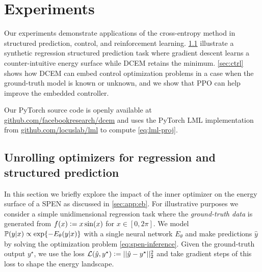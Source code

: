 \documentclass{article}
\begin{document}
\section{Experiments}
Our experiments demonstrate applications of the cross-entropy method
in structured prediction, control, and reinforcement learning.
\cref{sec:exp:reg} illustrate a synthetic regression structured
prediction task where gradient descent learns a counter-intuitive
energy surface while DCEM retains the minimum.
\cref{sec:ctrl} shows how DCEM can embed control optimization problems
in a case when the ground-truth model is known or unknown, and
we show that PPO \citep{schulman2017proximal} can help improve
the embedded controller.

Our PyTorch \citep{paszke2019pytorch} source code is openly available at
\href{http://github.com/facebookresearch/dcem}{github.com/facebookresearch/dcem}
and uses the PyTorch LML implementation
from \href{https://github.com/locuslab/lml}{github.com/locuslab/lml}
to compute \cref{eq:lml-proj}.

\subsection{Unrolling optimizers for regression
  and structured prediction}
\label{sec:exp:reg}

In this section we briefly explore the impact of the inner
optimizer on the energy surface of a SPEN as discussed in
\cref{sec:app:eb}.
For illustrative purposes we consider a simple unidimensional regression task
where the \emph{ground-truth data} is generated from $f(x)\vcentcolon= x\sin(x)$
for $x\in[0, 2\pi]$.
We model ${\mathbb{P}}(y|x) \propto \exp\{-E_\theta(y|x)\}$
with a single neural network $E_\theta$ and make predictions
$\hat y$ by solving the optimization problem
\cref{eq:spen-inference}.
Given the ground-truth output $y^\star$,
we use the loss $\mathcal{L}(\hat y, y^\star) \vcentcolon= ||\hat y - y^\star||_2^2$
and take gradient steps of this loss to shape the energy landscape.
\end{document}
